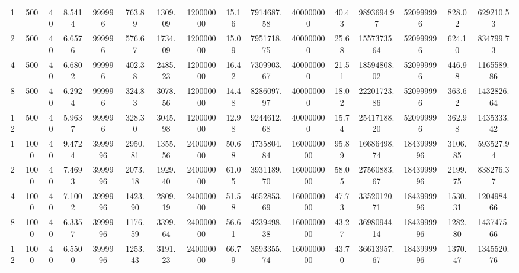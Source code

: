 \begin{landscape}
\begin{table}[h!]
\begin{tabularx}{\hsize}{cccccccccccccccc}
	1  & 500  & 40 & 8.5414 & 999996  & 763.89  & 1309.09 & 120000000 & 15.16 & 7914687.58  & 400000000  & 40.43 & 9893694.97  & 520999996  & 828.02  & 629210.53  \\
	2  & 500  & 40 & 6.6576 & 999996  & 576.67  & 1734.09 & 120000000 & 15.09 & 7951718.75  & 400000000  & 25.68 & 15573735.64 & 520999996  & 624.10  & 834799.73  \\
	4  & 500  & 40 & 6.6802 & 999996  & 402.38  & 2485.23 & 120000000 & 16.42 & 7309903.67  & 400000000  & 21.51 & 18594808.02 & 520999996  & 446.98  & 1165589.86 \\
	8  & 500  & 40 & 6.2924 & 999996  & 324.83  & 3078.56 & 120000000 & 14.48 & 8286097.97  & 400000000  & 18.02 & 22201723.86 & 520999996  & 363.62  & 1432826.64 \\
	12 & 500  & 40 & 5.9637 & 999996  & 328.30  & 3045.98 & 120000000 & 12.98 & 9244612.68  & 400000000  & 15.74 & 25417188.20 & 520999996  & 362.98  & 1435333.42 \\
	1  & 1000 & 40 & 9.4724 & 3999996 & 2950.81 & 1355.56 & 240000000 & 50.68 & 4735804.84  & 1600000000 & 95.89 & 16686498.74 & 1843999996 & 3106.85 & 593527.94  \\
	2  & 1000 & 40 & 7.4693 & 3999996 & 2073.18 & 1929.40 & 240000000 & 61.05 & 3931189.70  & 1600000000 & 58.05 & 27560883.67 & 1843999996 & 2199.75 & 838276.37  \\
	4  & 1000 & 40 & 7.1002 & 3999996 & 1423.90 & 2809.19 & 240000000 & 51.58 & 4652853.69  & 1600000000 & 47.73 & 33520120.71 & 1843999996 & 1530.31 & 1204984.66 \\
	8  & 1000 & 40 & 6.3357 & 3999996 & 1176.59 & 3399.64 & 240000000 & 56.61 & 4239498.38  & 1600000000 & 43.27 & 36980944.14 & 1843999996 & 1282.80 & 1437475.66 \\
	12 & 1000 & 40 & 6.5500 & 3999996 & 1253.43 & 3191.23 & 240000000 & 66.79 & 3593355.74  & 1600000000 & 43.70 & 36613957.67 & 1843999996 & 1370.47 & 1345520.76 \\
	\bottomrule
	\end{tabularx}
	\label{tab:anexo-performance}
	\end{table}
\end{landscape}
